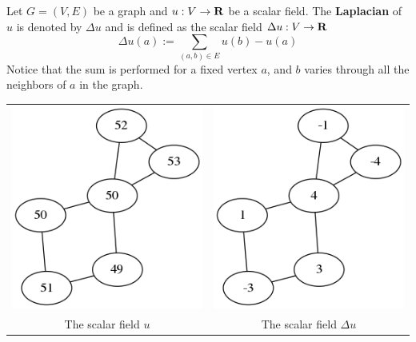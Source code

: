 Let $G=(V,E)$ be a graph and $u:V\to\mathbf{R}$ be a scalar field.  The
{\bf Laplacian}
of $u$ is denoted by $\Delta u$ and is defined as the scalar field $\Delta u:V\to\mathbf{R}$
\[
\Delta u(a) := \sum_{(a,b)\in E} u(b)-u(a)
\]
Notice that the sum is performed for a fixed vertex $a$, and $b$ varies
through all the neighbors of $a$ in the graph.

\begin{tabular}{cc}
	\includegraphics{graph3.png} &
	\includegraphics{graph4.png} \\
	The scalar field $u$ &
	The scalar field $\Delta u$
\end{tabular}

